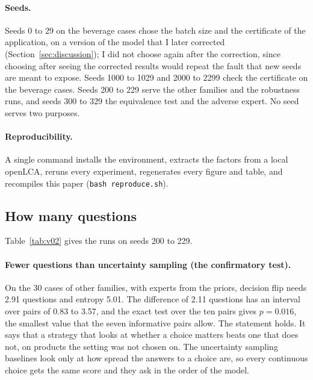 \documentclass{article}
\begin{document}
\paragraph{Seeds.}
Seeds 0 to 29 on the beverage cases chose the batch size and the certificate of the application, on a
version of the model that I later corrected (Section~\ref{sec:discussion}); I did not choose again after
the correction, since choosing after seeing the corrected results would repeat the fault that new seeds
are meant to expose. Seeds 1000 to 1029 and 2000 to 2299 check the certificate on the beverage cases.
Seeds 200 to 229 serve the other families and the robustness runs, and seeds 300 to 329 the equivalence
test and the adverse expert. No seed serves two purposes.

\paragraph{Reproducibility.}
A single command installs the environment, extracts the factors from a local openLCA, reruns every
experiment, regenerates every figure and table, and recompiles this paper (\texttt{bash reproduce.sh}).

\subsection{How many questions}\label{sec:questions}

Table~\ref{tab:v02} gives the runs on seeds 200 to 229.

\paragraph{Fewer questions than uncertainty sampling (the confirmatory test).}
On the 30 cases of other families, with experts from the priors, decision flip needs 2.91 questions and
entropy 5.01. The difference of 2.11 questions has an interval over pairs of 0.83 to 3.57, and the exact
test over the ten pairs gives $p=0.016$, the smallest value that the seven informative pairs allow. The
statement holds. It says that a strategy that looks at whether a choice matters beats one that does not,
on products the setting was not chosen on. The uncertainty sampling baselines look only at how spread the
answers to a choice are, so every continuous choice gets the same score and they ask in the order of the
model.
\end{document}
